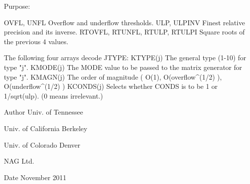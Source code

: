 \begin{DoxyParagraph}{Purpose\+: }
\begin{DoxyVerb}
     OVFL, UNFL      Overflow and underflow thresholds.
     ULP, ULPINV     Finest relative precision and its inverse.
     RTOVFL, RTUNFL,
     RTULP, RTULPI   Square roots of the previous 4 values.

             The following four arrays decode JTYPE:
     KTYPE(j)        The general type (1-10) for type "j".
     KMODE(j)        The MODE value to be passed to the matrix
                     generator for type "j".
     KMAGN(j)        The order of magnitude ( O(1),
                     O(overflow^(1/2) ), O(underflow^(1/2) )
     KCONDS(j)       Selects whether CONDS is to be 1 or
                     1/sqrt(ulp).  (0 means irrelevant.)\end{DoxyVerb}
 
\end{DoxyParagraph}
\begin{DoxyAuthor}{Author}
Univ. of Tennessee 

Univ. of California Berkeley 

Univ. of Colorado Denver 

N\+A\+G Ltd. 
\end{DoxyAuthor}
\begin{DoxyDate}{Date}
November 2011 
\end{DoxyDate}
\hypertarget{group__complex16__eig_ga23b67e5ea0fd86a8df3a60703acabef0}{}
